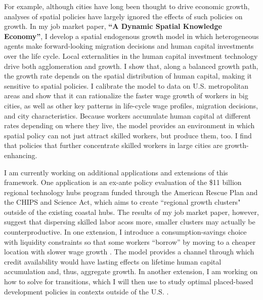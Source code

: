 \documentclass{jmstatement}
\begin{document}
\pagestyle{fancy}
\fancyhf{}
\fancyhead[L]{\bfseries\scshape \myname}
\fancyfoot[C]{\thepage}





\threesenID

For example, although cities have long been thought to drive economic growth, analyses
of spatial policies have largely ignored the effects of such policies on growth.
In my job market paper, \textbf{``A Dynamic Spatial Knowledge Economy''},
I develop a spatial endogenous growth model in which
heterogeneous agents make forward-looking migration decisions and
human capital investments over the life cycle.
Local externalities in the human capital investment technology
drive both agglomeration and growth.
I show that, along a balanced growth path, the growth rate depends on the spatial
distribution of human capital, making it sensitive to spatial policies.
I calibrate the model to data on U.S. metropolitan areas
and show that it can rationalize the faster wage growth of workers in big cities,
as well as other key patterns in life-cycle wage profiles, migration decisions,
and city characteristics.
Because workers accumulate human capital at different rates depending
on where they live, the model provides an environment in which spatial policy
can not just attract skilled workers, but produce them, too.
I find that policies that further concentrate skilled workers in large cities
are growth-enhancing.

I am currently working
on additional applications and extensions of this framework.
One application is an ex-ante policy evaluation of
the \$11 billion regional technology hubs program funded through
the American Rescue Plan and the CHIPS and Science Act, which aims to create
``regional growth clusters" outside of the existing coastal hubs.
The results of my job market paper, however, suggest that dispersing skilled labor
acoss more, smaller clusters may actually be counterproductive.
In one extension, I introduce a consumption-savings choice with liquidity constraints
so that some workers ``borrow'' by moving to a cheaper location with slower
wage growth \citep{BilalRossi-Hansberg2021}.
The model provides a channel through which credit availability would have
lasting effects on lifetime human capital accumulation and, thus, aggregate growth.
In another extension,
I am working on how to solve for transitions, which I will then use to study
optimal placed-based development policies in contexts outside of the U.S.
\citep{DurantonVenables2018}.
\end{document}
